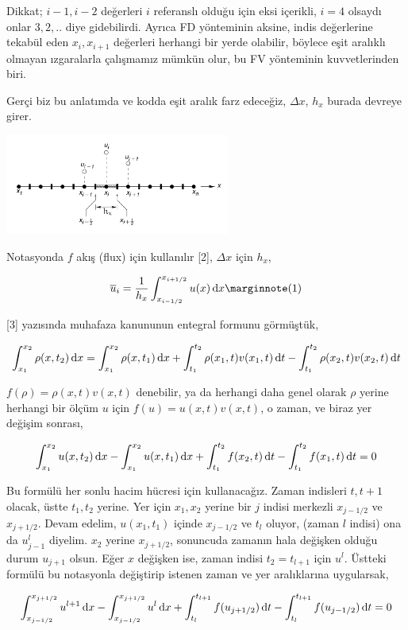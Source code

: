 \documentclass[12pt,fleqn]{article}\usepackage{../../common}
\begin{document}
Dikkat; $i-1,i-2$ değerleri $i$ referanslı olduğu için eksi içerikli, $i=4$
olsaydı onlar $3,2,..$ diye gidebilirdi. Ayrıca FD yönteminin aksine, indis
değerlerine tekabül eden $x_i,x_{i+1}$ değerleri herhangi bir yerde olabilir,
böylece eşit aralıklı olmayan ızgaralarla çalışmamız mümkün olur, bu FV
yönteminin kuvvetlerinden biri. 

Gerçi biz bu anlatımda ve kodda eşit aralık farz edeceğiz, $\Delta x$, $h_x$
burada devreye girer. 

\includegraphics[width=20em]{12-20-00.png}

Notasyonda $f$ akış (flux) için kullanılır [2], $\Delta x$ için $h_x$,

$$
\overline{u}_i =  \frac{1}{h_x} \int_{x_{i-1/2}}^{x_{i+1/2}} u(x) \ud x
\mlabel{1}
$$

[3] yazısında muhafaza kanununun entegral formunu görmüştük,

$$
\int _{x_1}^{x_2} \rho(x,t_2) \,\mathrm{d} x =
\int _{x_1}^{x_2} \rho(x,t_1) \,\mathrm{d} x  +
\int_{t_1}^{t_2} \rho(x_1,t) v(x_1,t) \,\mathrm{d} t -
\int_{t_1}^{t_2}  \rho(x_2,t) v(x_2,t) \,\mathrm{d} t
$$

$f(\rho) = \rho(x,t) v(x,t)$ denebilir, ya da herhangi daha genel olarak $\rho$
yerine herhangi bir ölçüm $u$ için $f(u) = u(x,t) v(x,t)$, o zaman, ve
biraz yer değişim sonrası,

$$
\int_{x_1}^{x_2} u(x,t_2) \,\mathrm{d} x -
\int_{x_1}^{x_2} u(x,t_1) \,\mathrm{d} x  +
\int_{t_1}^{t_2} f(x_2,t) \,\mathrm{d} t  -
\int_{t_1}^{t_2} f(x_1,t) \,\mathrm{d} t = 0
$$

Bu formülü her sonlu hacim hücresi için kullanacağız. Zaman indisleri $t,t+1$
olacak, üstte $t_1,t_2$ yerine. Yer için $x_1,x_2$ yerine bir $j$ indisi
merkezli $x_{j-1/2}$ ve $x_{j+1/2}$. Devam edelim, $u(x_1,t_1)$ içinde
$x_{j-1/2}$ ve $t_l$ oluyor, (zaman $l$ indisi) ona da $u_{j-1}^l$
diyelim. $x_2$ yerine $x_{j+1/2}$, sonuncuda zamanın hala değişken olduğu durum
$u_{j+1}$ olsun. Eğer $x$ değişken ise, zaman indisi $t_2 = t_{l+1}$ için
$u^{l}$. Üstteki formülü bu notasyonla değiştirip istenen zaman ve yer
aralıklarına uygularsak,

$$
\int_{x_{j-1/2}}^{x_{j+1/2}} u^{l+1} \,\mathrm{d} x -
\int_{x_{j-1/2}}^{x_{j+1/2}} u^{l} \,\mathrm{d} x  +
\int_{t_l}^{t_{l+1}} f(u_{j+1/2}) \,\mathrm{d} t  -
\int_{t_l}^{t_{l+1}} f(u_{j-1/2}) \,\mathrm{d} t = 0
$$
\end{document}

